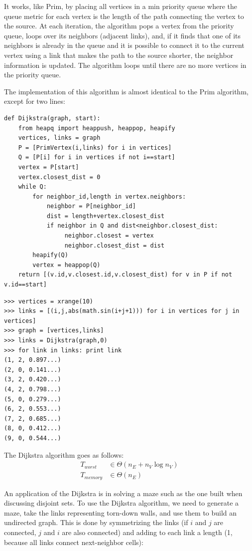 \documentclass[justified,sixbynine]{tufte-book}
\def\ft{\small\tt}
\theoremstyle{plain}%
\theoremstyle{definition}
\theoremstyle{remark}
\begin{document}
\begin{fullwidth}
It works, like Prim, by placing all vertices in a min priority queue where the queue metric for each vertex is the length of the path connecting the vertex to the source. At each iteration, the algorithm pops a vertex from the priority queue, loops over its neighbors (adjacent links), and, if it finds that one of its neighbors is already in the queue and it is possible to connect it to the current vertex using a link that makes the path to the source shorter, the neighbor information is updated. The algorithm loops until there are no more vertices in the priority queue.

The implementation of this algorithm is almost identical to the Prim algorithm, except for two lines:

\begin{lstlisting}[caption={in file: {\ft nlib.py}}]
def Dijkstra(graph, start):
    from heapq import heappush, heappop, heapify
    vertices, links = graph
    P = [PrimVertex(i,links) for i in vertices]
    Q = [P[i] for i in vertices if not i==start]
    vertex = P[start]
    vertex.closest_dist = 0
    while Q:
        for neighbor_id,length in vertex.neighbors:
            neighbor = P[neighbor_id]
            dist = length+vertex.closest_dist
            if neighbor in Q and dist<neighbor.closest_dist:
                 neighbor.closest = vertex
                 neighbor.closest_dist = dist
        heapify(Q)
        vertex = heappop(Q)
    return [(v.id,v.closest.id,v.closest_dist) for v in P if not v.id==start]
\end{lstlisting}

\begin{lstlisting}[caption={in file: {\ft nlib.py}}]
>>> vertices = xrange(10)
>>> links = [(i,j,abs(math.sin(i+j+1))) for i in vertices for j in vertices]
>>> graph = [vertices,links]
>>> links = Dijkstra(graph,0)
>>> for link in links: print link
(1, 2, 0.897...)
(2, 0, 0.141...)
(3, 2, 0.420...)
(4, 2, 0.798...)
(5, 0, 0.279...)
(6, 2, 0.553...)
(7, 2, 0.685...)
(8, 0, 0.412...)
(9, 0, 0.544...)
\end{lstlisting}

The Dijkstra algorithm goes as follows:
\begin{align}
T_{worst} &\in \Theta (n_E+n_V\log n_V) \\
T_{memory} &\in \Theta (n_E)
\end{align}

An application of the Dijkstra is in solving a maze such as the one built when discussing disjoint sets. To use the Dijkstra algorithm, we need to generate a maze, take the links representing torn-down walls, and use them to build an undirected graph. This is done by symmetrizing the links (if $i$ and $j$ are connected, $j$ and $i$ are also connected) and adding to each link a length (1, because all links connect next-neighbor cells):



\end{fullwidth}
\end{document}
